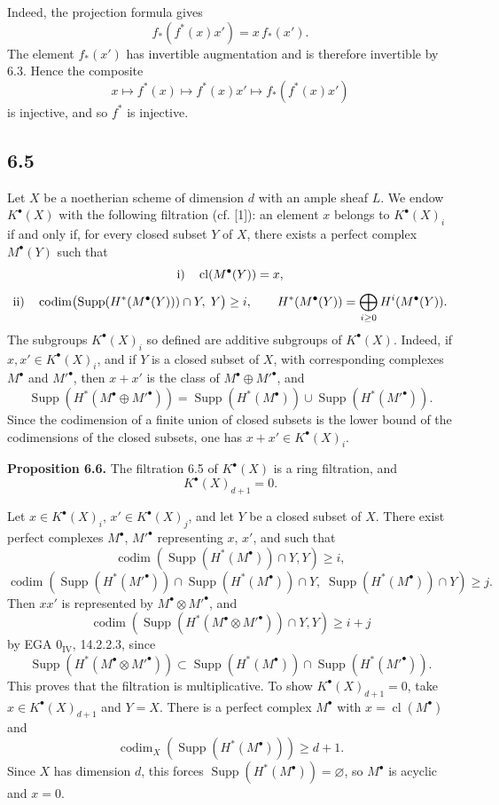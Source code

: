 \documentclass[11pt]{article}
\providecommand{\codim}{\operatorname{codim}}
\providecommand{\Supp}{\operatorname{Supp}}
\providecommand{\codim}{\operatorname{codim}}
\begin{document}
Indeed, the projection formula gives
\[
  f_*(f^*(x)x')=x\,f_*(x').
\]
The element \(f_*(x')\) has invertible augmentation and is therefore invertible by 6.3. Hence the composite
\[
  x\longmapsto f^*(x)\longmapsto f^*(x)x'\longmapsto f_*(f^*(x)x')
\]
is injective, and so \(f^*\) is injective.

\subsection*{6.5}
Let \(X\) be a noetherian scheme of dimension \(d\) with an ample sheaf \(L\). We endow \(K^\bullet(X)\) with the following filtration (cf. [1]): an element \(x\) belongs to \(K^\bullet(X)_i\) if and only if, for every closed subset \(Y\) of \(X\), there exists a perfect complex \(M^\bullet(Y)\) such that
\[
  \text{\rm i)}\quad \operatorname{cl}(M^\bullet(Y))=x,
\]
\[
  \text{\rm ii)}\quad
  \codim\bigl(\Supp(H^*(M^\bullet(Y)))\cap Y,\;Y\bigr)\geq i,
  \qquad
  H^*(M^\bullet(Y))=\bigoplus_{i\geq0}H^i(M^\bullet(Y)).
\]
The subgroups \(K^\bullet(X)_i\) so defined are additive subgroups of \(K^\bullet(X)\). Indeed, if \(x,x'\in K^\bullet(X)_i\), and if \(Y\) is a closed subset of \(X\), with corresponding complexes \(M^\bullet\) and \(M'^\bullet\), then \(x+x'\) is the class of \(M^\bullet\oplus M'^\bullet\), and
\[
  \Supp(H^*(M^\bullet\oplus M'^\bullet))
  =
  \Supp(H^*(M^\bullet))\cup\Supp(H^*(M'^\bullet)).
\]
Since the codimension of a finite union of closed subsets is the lower bound of the codimensions of the closed subsets, one has \(x+x'\in K^\bullet(X)_i\).

\textbf{Proposition 6.6.} The filtration 6.5 of \(K^\bullet(X)\) is a ring filtration, and
\[
  K^\bullet(X)_{d+1}=0.
\]

Let \(x\in K^\bullet(X)_i\), \(x'\in K^\bullet(X)_j\), and let \(Y\) be a closed subset of \(X\). There exist perfect complexes \(M^\bullet\), \(M'^\bullet\) representing \(x\), \(x'\), and such that
\[
  \codim(\Supp(H^*(M^\bullet))\cap Y,Y)\geq i,
\]
\[
  \codim(\Supp(H^*(M'^\bullet))\cap\Supp(H^*(M^\bullet))\cap Y,\;
          \Supp(H^*(M^\bullet))\cap Y)\geq j.
\]
Then \(xx'\) is represented by \(M^\bullet\otimes M'^\bullet\), and
\[
  \codim(\Supp(H^*(M^\bullet\otimes M'^\bullet))\cap Y,Y)\geq i+j
\]
by EGA \(0_{\mathrm{IV}}\), 14.2.2.3, since
\[
  \Supp(H^*(M^\bullet\otimes M'^\bullet))
  \subset
  \Supp(H^*(M^\bullet))\cap \Supp(H^*(M'^\bullet)).
\]
This proves that the filtration is multiplicative. To show \(K^\bullet(X)_{d+1}=0\), take \(x\in K^\bullet(X)_{d+1}\) and \(Y=X\). There is a perfect complex \(M^\bullet\) with \(x=\operatorname{cl}(M^\bullet)\) and
\[
  \codim_X(\Supp(H^*(M^\bullet)))\geq d+1.
\]
Since \(X\) has dimension \(d\), this forces \(\Supp(H^*(M^\bullet))=\varnothing\), so \(M^\bullet\) is acyclic and \(x=0\).
\end{document}
